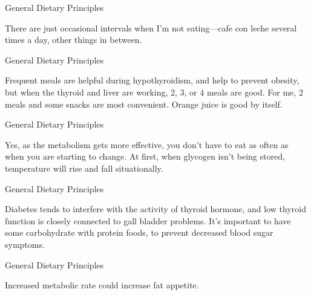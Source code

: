 \documentclass[11pt,oneside,openany,extrafontsizes]{memoir}
\begin{document}
\begin{standalonequote}{General Dietary Principles}

    \begin{answer}
        There are just occasional intervals when I'm not eating---cafe con leche several times a day, other things in between.
    \end{answer}
\end{standalonequote}

\begin{standalonequote}{General Dietary Principles}

    \begin{answer}
        Frequent meals are helpful during hypothyroidism, and help to prevent obesity, but when the thyroid and liver are working, 2, 3, or 4 meals are good. For me, 2 meals and some snacks are most convenient. Orange juice is good by itself.
    \end{answer}
\end{standalonequote}

\begin{standalonequote}{General Dietary Principles}

    \begin{answer}
        Yes, as the metabolism gets more effective, you don't have to eat as often as when you are starting to change. At first, when glycogen isn't being stored, temperature will rise and fall situationally.
    \end{answer}
\end{standalonequote}

\begin{standalonequote}{General Dietary Principles}

    \begin{answer}
        Diabetes tends to interfere with the activity of thyroid hormone, and low thyroid function is closely connected to gall bladder problems. It's important to have some carbohydrate with protein foods, to prevent decreased blood sugar symptoms.
    \end{answer}
\end{standalonequote}

\begin{standalonequote}{General Dietary Principles}

    \begin{answer}
        Increased metabolic rate could increase fat appetite.
    \end{answer}
\end{standalonequote}
\end{document}
